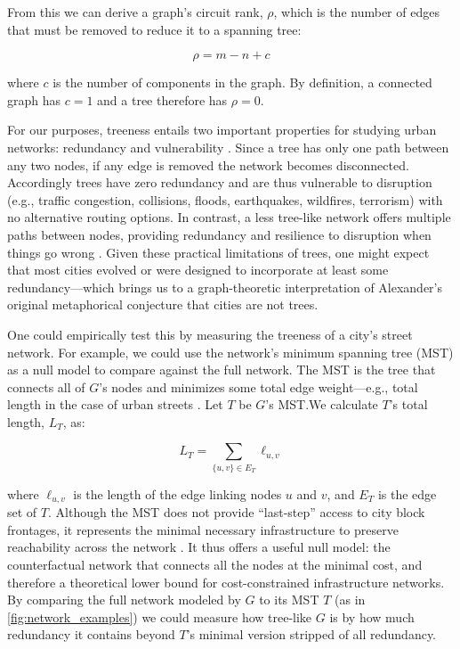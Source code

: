 \documentclass[12pt,letterpaper]{article} %
\begin{document}
From this we can derive a graph's circuit rank, $\rho$, which is the number of edges that must be removed to reduce it to a spanning tree:

\begin{equation}
  \label{eq:circuit_rank}
  \rho = m - n + c
\end{equation}

where $c$ is the number of components in the graph. By definition, a connected graph has $c = 1$ and a tree therefore has $\rho = 0$.

For our purposes, treeness entails two important properties for studying urban networks: redundancy and vulnerability \citep{xie_2007_measuring,barthelemy_morphogenesis_2017,barthelemy_2022_spatial}. Since a tree has only one path between any two nodes, if any edge is removed the network becomes disconnected. Accordingly trees have zero redundancy and are thus vulnerable to disruption (e.g., traffic congestion, collisions, floods, earthquakes, wildfires, terrorism) with no alternative routing options. In contrast, a less tree-like network offers multiple paths between nodes, providing redundancy and resilience to disruption when things go wrong \citep{barthelemy_spatial_2011}. Given these practical limitations of trees, one might expect that most cities evolved or were designed to incorporate at least some redundancy---which brings us to a graph-theoretic interpretation of Alexander's original metaphorical conjecture that cities are not trees.

One could empirically test this by measuring the treeness of a city's street network. For example, we could use the network's minimum spanning tree (MST) as a null model to compare against the full network. The MST is the tree that connects all of $G$'s nodes and minimizes some total edge weight---e.g., total length in the case of urban streets \citep{barthelemy_morphogenesis_2017}. Let $T$ be $G$'s MST.\@ We calculate $T$'s total length, $L_T$, as:

\begin{equation}
  \label{eq:total_edge_length}
  L_T = \sum_{\{u, v\} \in E_T} \ell_{u, v}
\end{equation}

where $\ell_{u, v}$ is the length of the edge linking nodes $u$ and $v$, and $E_T$ is the edge set of $T$. Although the MST does not provide \enquote{last-step} access to city block frontages, it represents the minimal necessary infrastructure to preserve reachability across the network \citep{cardillo_2006_structural,barthelemy_2022_spatial}. It thus offers a useful null model: the counterfactual network that connects all the nodes at the minimal cost, and therefore a theoretical lower bound for cost-constrained infrastructure networks. By comparing the full network modeled by $G$ to its MST $T$ (as in \autoref{fig:network_examples}) we could measure how tree-like $G$ is by how much redundancy it contains beyond $T$'s minimal version stripped of all redundancy.
\end{document}
